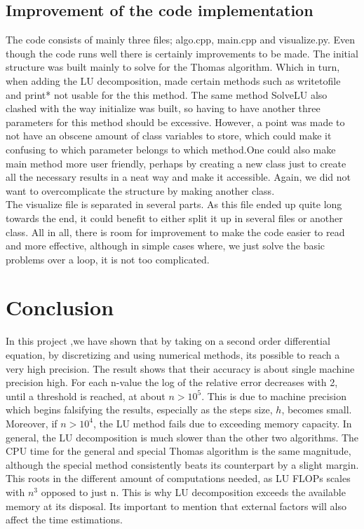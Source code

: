 \documentclass[%
oneside,                 %
final,                   %
10pt]{article}
\begin{document}
\subsection*{Improvement of the code implementation} 
The code consists of mainly three files; algo.cpp, main.cpp and visualize.py. Even though the code runs well there is certainly improvements to be made. The initial structure was built mainly to solve for the Thomas algorithm. Which in turn, when adding the LU decomposition, made certain methods such as writetofile and print* not usable for the this method. The same method SolveLU also clashed with the way initialize was built, so having to have another three parameters for this method should be excessive. However, a point was made to not have an obscene amount of class variables to store, which could make it confusing to which parameter belongs to which method.One could also make main method more user friendly, perhaps by creating a new class just to create all the necessary results in a neat way and make it accessible. Again, we did not want to overcomplicate the structure by making another class. \\
The visualize file is separated in several parts. As this file ended up quite long towards the end, it could benefit to either split it up in several files or another class. All in all, there is room for improvement to make the code easier to read and more effective, although in simple cases where, we just solve the basic problems over a loop, it is not too complicated.

\section*{Conclusion}
In this project ,we have shown that by taking on a second order differential equation, by discretizing and using numerical methods, its possible to reach a very high precision. The result shows that their accuracy is about single machine precision high.  For each n-value the log of the relative error decreases with 2, until a threshold is reached, at about $n > 10^5$. This is due to machine precision which begins falsifying the results, especially as the steps size, $h$, becomes small.
Moreover, if $n>10^4$, the LU method fails due to exceeding memory capacity. In general, the LU decomposition is much slower than the other two algorithms.
The CPU time for the general and special Thomas algorithm is the same magnitude, although the special method consistently beats its counterpart by a slight margin. This roots in the different amount of computations needed, as LU FLOPs scales with $n^3$ opposed to just n. This is why LU decomposition exceeds the available memory at its disposal. Its important to mention that external factors will also affect the time estimations. 




\end{document}
